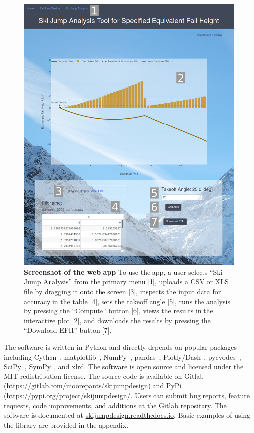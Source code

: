 \documentclass{article}
\begin{document}
\begin{figure}
  \centering
  \includegraphics[width=5.00in]{figures/web-app-screenshot.png}
  \caption{\textbf{Screenshot of the web app} To use the app, a user selects
    ``Ski Jump Analysis'' from the primary menu [1], uploads a CSV or XLS file
    by dragging it onto the screen [3], inspects the input data for accuracy in
    the table [4], sets the takeoff angle [5], runs the analysis by pressing
    the ``Compute'' button [6], views the results in the interactive plot [2],
    and downloads the results by pressing the ``Download EFH'' button [7].}
  \label{fig:web-app-screenshot}
\end{figure}

The software is written in Python and directly depends on popular packages
including Cython~\cite{Behnel2011}, matplotlib~\cite{Hunter2007},
NumPy~\cite{Oliphant2006}, pandas~\cite{McKinney2020},
Plotly/Dash~\cite{Plotly2015}, pycvodes~\cite{Dahlgren2018},
SciPy~\cite{Virtanen2020}, SymPy~\cite{Meurer2017}, and xlrd.
The software is open source and licensed under the MIT redistribution license.
The source code is available on Gitlab
(\url{https://gitlab.com/moorepants/skijumpdesign}) and PyPi
(\url{https://pypi.org/project/skijumpdesign/}. Users can submit bug reports, feature
requests, code improvements, and additions at the Gitlab repository. The
software is documented at
\href{https://skijumpdesign.readthedocs.io}{skijumpdesign.readthedocs.io}.
Basic examples of using the library are provided in the appendix.
\end{document}
